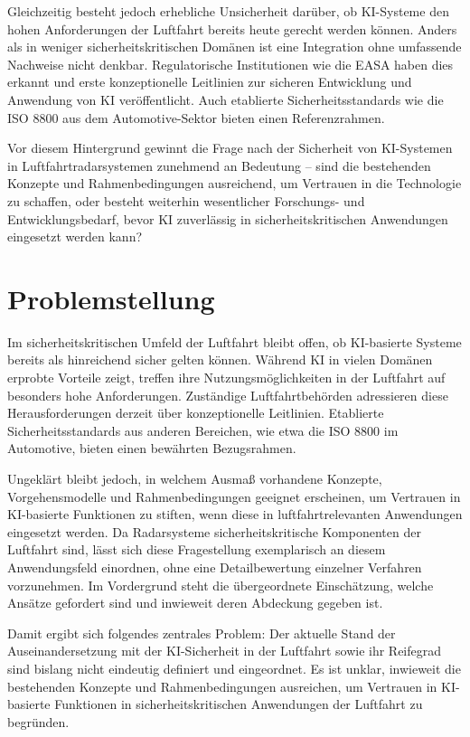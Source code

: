 Gleichzeitig besteht jedoch erhebliche Unsicherheit darüber, ob KI-Systeme den hohen 
Anforderungen der Luftfahrt bereits heute gerecht werden können. Anders als in weniger 
sicherheitskritischen Domänen ist eine Integration ohne umfassende Nachweise nicht denkbar. 
Regulatorische Institutionen wie die EASA haben dies erkannt und erste konzeptionelle 
Leitlinien zur sicheren Entwicklung und Anwendung von KI veröffentlicht. 
Auch etablierte Sicherheitsstandards wie die ISO 8800 aus dem Automotive-Sektor 
bieten einen Referenzrahmen.

Vor diesem Hintergrund gewinnt die Frage nach der Sicherheit von KI-Systemen in 
Luftfahrtradarsystemen zunehmend an Bedeutung -- sind die bestehenden Konzepte und 
Rahmenbedingungen ausreichend, um Vertrauen in die Technologie zu schaffen, 
oder besteht weiterhin wesentlicher Forschungs- und Entwicklungsbedarf, bevor KI 
zuverlässig in sicherheitskritischen Anwendungen eingesetzt werden kann?




\section{Problemstellung}
Im sicherheitskritischen Umfeld der Luftfahrt bleibt offen, ob KI-basierte Systeme 
bereits als hinreichend sicher gelten können. Während KI in vielen Domänen erprobte 
Vorteile zeigt, treffen ihre Nutzungsmöglichkeiten in der Luftfahrt auf besonders 
hohe Anforderungen. Zuständige 
Luftfahrtbehörden adressieren diese Herausforderungen derzeit über konzeptionelle 
Leitlinien. Etablierte Sicherheitsstandards aus anderen Bereichen, wie etwa die ISO 8800 
im Automotive, bieten einen bewährten Bezugsrahmen.

Ungeklärt bleibt jedoch, in welchem Ausmaß vorhandene Konzepte, Vorgehensmodelle 
und Rahmenbedingungen geeignet erscheinen, um Vertrauen in KI-basierte Funktionen zu 
stiften, wenn diese in luftfahrtrelevanten Anwendungen eingesetzt werden. 
Da Radarsysteme sicherheitskritische Komponenten der Luftfahrt sind, lässt 
sich diese Fragestellung exemplarisch an diesem Anwendungsfeld einordnen, 
ohne eine Detailbewertung einzelner Verfahren vorzunehmen. Im Vordergrund steht die 
übergeordnete Einschätzung, welche Ansätze gefordert sind und inwieweit deren 
Abdeckung gegeben ist.

Damit ergibt sich folgendes zentrales Problem: Der aktuelle Stand der Auseinandersetzung 
mit der KI-Sicherheit in der Luftfahrt sowie ihr Reifegrad sind bislang nicht eindeutig 
definiert und eingeordnet. Es ist unklar, inwieweit die bestehenden Konzepte und 
Rahmenbedingungen ausreichen, um Vertrauen in KI-basierte Funktionen in sicherheitskritischen 
Anwendungen der Luftfahrt zu begründen.


